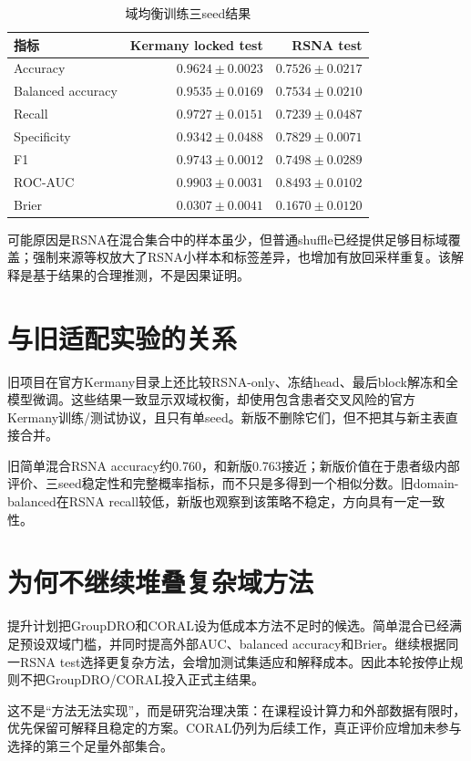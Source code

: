 \begin{table}[H]
\centering
\caption{域均衡训练三seed结果}
\begin{tabular}{lrr}
\toprule 指标 & Kermany locked test & RSNA test\\\midrule
Accuracy & $0.9624\pm0.0023$ & $0.7526\pm0.0217$\\
Balanced accuracy & $0.9535\pm0.0169$ & $0.7534\pm0.0210$\\
Recall & $0.9727\pm0.0151$ & $0.7239\pm0.0487$\\
Specificity & $0.9342\pm0.0488$ & $0.7829\pm0.0071$\\
F1 & $0.9743\pm0.0012$ & $0.7498\pm0.0289$\\
ROC-AUC & $0.9903\pm0.0031$ & $0.8493\pm0.0102$\\
Brier & $0.0307\pm0.0041$ & $0.1670\pm0.0120$\\\bottomrule
\end{tabular}
\end{table}

可能原因是RSNA在混合集合中的样本虽少，但普通shuffle已经提供足够目标域覆盖；强制来源等权放大了RSNA小样本和标签差异，也增加有放回采样重复。该解释是基于结果的合理推测，不是因果证明。

\section{与旧适配实验的关系}

旧项目在官方Kermany目录上还比较RSNA-only、冻结head、最后block解冻和全模型微调。这些结果一致显示双域权衡，却使用包含患者交叉风险的官方Kermany训练/测试协议，且只有单seed。新版不删除它们，但不把其与新主表直接合并。

旧简单混合RSNA accuracy约0.760，和新版0.763接近；新版价值在于患者级内部评价、三seed稳定性和完整概率指标，而不只是多得到一个相似分数。旧domain-balanced在RSNA recall较低，新版也观察到该策略不稳定，方向具有一定一致性。

\section{为何不继续堆叠复杂域方法}

提升计划把GroupDRO和CORAL设为低成本方法不足时的候选。简单混合已经满足预设双域门槛，并同时提高外部AUC、balanced accuracy和Brier。继续根据同一RSNA test选择更复杂方法，会增加测试集适应和解释成本。因此本轮按停止规则不把GroupDRO/CORAL投入正式主结果。

这不是“方法无法实现”，而是研究治理决策：在课程设计算力和外部数据有限时，优先保留可解释且稳定的方案。CORAL仍列为后续工作，真正评价应增加未参与选择的第三个足量外部集合。

